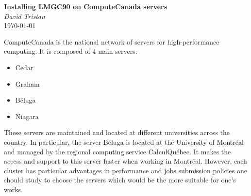 \documentclass[12pt]{article}
\begin{document}
\thispagestyle{mypagestyle}

\begin{center}
  \textbf{\large Installing LMGC90 on ComputeCanada servers}\\
  \textit{David}  \hspace{0.5cm} \textit{Tristan}  \\
  \today
\end{center}




ComputeCanada is the national network of servers for high-performance computing. It is composed of 4 main servers:
\begin{itemize}
    \item Cedar
    \item Graham
    \item Béluga
    \item Niagara
\end{itemize}

These servers are maintained and located at different universities across the country. In particular, the server Béluga is located at the University of Montréal and managed by the regional computing service CalculQuébec. It makes the access and support to this server faster when working in Montréal. However, each cluster has particular advantages in performance and jobs submission policies one should study to choose the servers which would be the more suitable for one's works.
\end{document}
